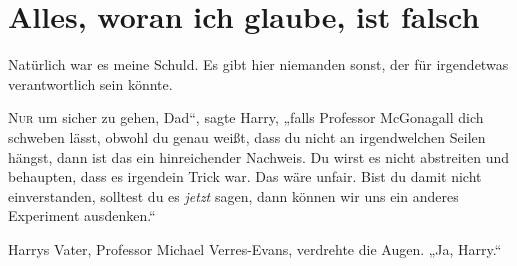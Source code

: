 \chapter{Alles, woran ich glaube, ist falsch}

\begin{chapterOpeningQuote}
Natürlich war es meine Schuld. Es gibt hier niemanden sonst, der für irgendetwas verantwortlich sein könnte.
\end{chapterOpeningQuote}

\lettrine[ante=„]{N}{ur} um sicher zu gehen, Dad“, sagte Harry, „falls Professor McGonagall dich schweben lässt, obwohl du genau weißt, dass du nicht an irgendwelchen Seilen hängst, dann ist das ein hinreichender Nachweis. Du wirst es nicht abstreiten und behaupten, dass es irgendein Trick war. Das wäre unfair. Bist du damit nicht einverstanden, solltest du es \emph{jetzt} sagen, dann können wir uns ein anderes Experiment ausdenken.“

Harrys Vater, Professor Michael Verres-Evans, verdrehte die Augen. „Ja, Harry.“

